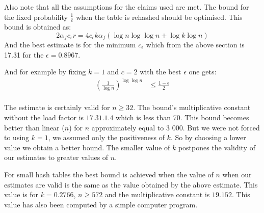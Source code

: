 Also note that all the assumptions for the claims used are met. The bound for the fixed probability $\frac{1}{c}$ when the table is rehashed should be optimised. This bound is obtained as:
\begin{displaymath}
2 \alpha_f c_\epsilon r = 4 c_\epsilon k \alpha_f (\log n \log \log n + \log k \log n)
\end{displaymath}
And the best estimate is for the minimum $c_\epsilon$ which from the above section is 17.31 for the $\epsilon = 0.8967$.

And for example by fixing $k = 1$ and $c = 2$ with the best $\epsilon$ one gets:
\begin{displaymath}
\begin{split}
\left(\frac{1}{\log n}\right)^{\log \log n} & \leq \frac{1 - \epsilon}{2} \\
\end{split}
\end{displaymath}

The estimate is certainly valid for $n \geq 32$. The bound's multiplicative constant without the load factor is $17.31 . 1 . 4$ which is less than 70. This bound becomes better than linear ($n$) for $n$ approximately equal to 3 000. But we were not forced to using $k = 1$, we assumed only the positiveness of $k$. So by choosing a lower value we obtain a better bound. The smaller value of $k$ postpones the validity of our estimates to greater values of $n$.

For small hash tables the best bound is achieved when the value of $n$ when our estimates are valid is the same as the value obtained by the above estimate. This value is for $k = 0.2766$, $n \geq 572$ and the multiplicative constant is $19.152$. This value has also been computed by a simple computer program.
